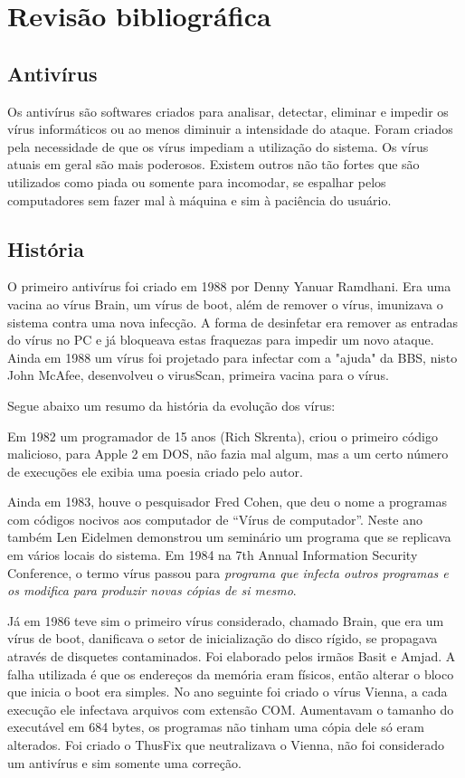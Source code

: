 
\chapter{Revisão bibliográfica}


\section{Antivírus}
	Os antivírus \cite{Szor} são softwares criados para analisar, detectar, eliminar e impedir os vírus informáticos ou ao menos diminuir a intensidade do ataque. Foram criados pela necessidade de que os vírus impediam a utilização do sistema. Os vírus atuais em geral são mais poderosos. Existem outros não tão fortes que são utilizados como piada ou somente para incomodar, se espalhar pelos computadores sem fazer mal à máquina e sim à paciência do usuário.

\section{História}
	O primeiro antivírus foi criado em 1988 por Denny Yanuar Ramdhani. Era uma vacina ao vírus Brain, um vírus de boot, além de remover o vírus, imunizava o sistema contra uma nova infecção. A forma de desinfetar era remover as entradas do vírus no PC e já bloqueava estas fraquezas para impedir um novo ataque. Ainda em 1988 um vírus foi projetado para infectar com a "ajuda" da BBS, nisto John	McAfee, desenvolveu o virusScan, primeira vacina para o vírus.

	Segue abaixo um resumo da história da evolução dos vírus:
	
	Em 1982 um programador de 15 anos (Rich Skrenta), criou o primeiro código malicioso, para Apple 2 em DOS, não fazia mal algum, mas a um certo número de execuções ele exibia uma poesia criado pelo autor.
	
	
	Ainda em 1983, houve o pesquisador Fred Cohen, que deu o nome a programas com códigos nocivos aos computador de “Vírus de computador”. Neste ano também Len Eidelmen demonstrou um seminário um programa que se replicava em vários locais do sistema. Em 1984 na 7th Annual Information Security Conference, o termo vírus passou para \textit{programa que infecta outros programas e os modifica para produzir novas cópias de si mesmo}. 
	
	
	Já em 1986 teve sim o primeiro vírus considerado, chamado Brain, que era um vírus de boot, danificava o setor de inicialização do disco rígido, se propagava através de disquetes contaminados. Foi elaborado pelos irmãos Basit e Amjad. A falha utilizada é que os endereços da memória eram físicos, então alterar o bloco que inicia o boot era simples. No ano seguinte foi criado o vírus Vienna, a cada execução ele infectava arquivos com extensão COM. Aumentavam o tamanho do executável em 684 bytes, os programas não tinham uma cópia dele só eram alterados. Foi criado o ThusFix que neutralizava o Vienna, não foi considerado um antivírus e sim somente uma correção.


